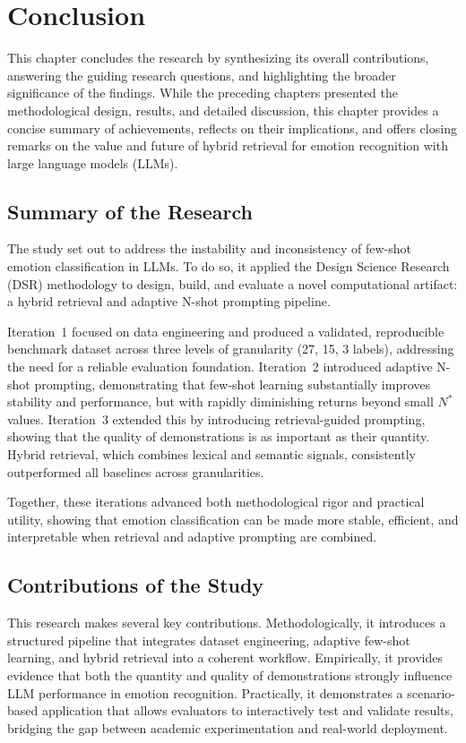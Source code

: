 \chapter{Conclusion}
\label{chap:conclusion}

This chapter concludes the research by synthesizing its overall contributions, answering the guiding research questions, and highlighting the broader significance of the findings. While the preceding chapters presented the methodological design, results, and detailed discussion, this chapter provides a concise summary of achievements, reflects on their implications, and offers closing remarks on the value and future of hybrid retrieval for emotion recognition with large language models (LLMs).

\section{Summary of the Research}
The study set out to address the instability and inconsistency of few-shot emotion classification in LLMs. To do so, it applied the Design Science Research (DSR) methodology to design, build, and evaluate a novel computational artifact: a hybrid retrieval and adaptive N-shot prompting pipeline.  

Iteration~1 focused on data engineering and produced a validated, reproducible benchmark dataset across three levels of granularity (27, 15, 3 labels), addressing the need for a reliable evaluation foundation. Iteration~2 introduced adaptive N-shot prompting, demonstrating that few-shot learning substantially improves stability and performance, but with rapidly diminishing returns beyond small $N^{\ast}$ values. Iteration~3 extended this by introducing retrieval-guided prompting, showing that the quality of demonstrations is as important as their quantity. Hybrid retrieval, which combines lexical and semantic signals, consistently outperformed all baselines across granularities.  

Together, these iterations advanced both methodological rigor and practical utility, showing that emotion classification can be made more stable, efficient, and interpretable when retrieval and adaptive prompting are combined.

\section{Contributions of the Study}
This research makes several key contributions. Methodologically, it introduces a structured pipeline that integrates dataset engineering, adaptive few-shot learning, and hybrid retrieval into a coherent workflow. Empirically, it provides evidence that both the quantity and quality of demonstrations strongly influence LLM performance in emotion recognition. Practically, it demonstrates a scenario-based application that allows evaluators to interactively test and validate results, bridging the gap between academic experimentation and real-world deployment.

